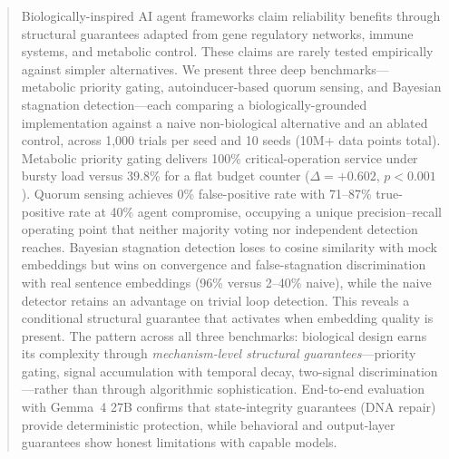 \begin{abstract}
Biologically-inspired AI agent frameworks claim reliability benefits
through structural guarantees adapted from gene regulatory networks,
immune systems, and metabolic control.  These claims are rarely tested
empirically against simpler alternatives.  We present three deep
benchmarks---metabolic priority gating, autoinducer-based quorum
sensing, and Bayesian stagnation detection---each comparing a
biologically-grounded implementation against a naive non-biological
alternative and an ablated control, across 1{,}000 trials per seed
and 10 seeds (10M+ data points total).  Metabolic priority gating
delivers 100\% critical-operation service under bursty load versus
39.8\% for a flat budget counter ($\Delta = +0.602$, $p < 0.001$).
Quorum sensing achieves 0\% false-positive rate with 71--87\%
true-positive rate at 40\% agent compromise, occupying a unique
precision--recall operating point that neither majority voting nor
independent detection reaches.  Bayesian stagnation detection loses to cosine similarity with mock
embeddings but wins on convergence and false-stagnation discrimination
with real sentence embeddings (96\% versus 2--40\% naive), while the
naive detector retains an advantage on trivial loop detection.  This
reveals a conditional structural guarantee that activates when
embedding quality is present.  The
pattern across all three benchmarks: biological design earns its
complexity through \emph{mechanism-level structural guarantees}---priority
gating, signal accumulation with temporal decay, two-signal
discrimination---rather than through algorithmic sophistication.
End-to-end evaluation with Gemma~4 27B confirms that state-integrity
guarantees (DNA repair) provide deterministic protection, while
behavioral and output-layer guarantees show honest limitations with
capable models.
\end{abstract}
